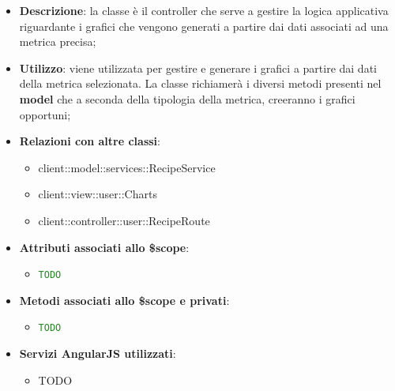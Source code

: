 			\begin{itemize}
				\item \textbf{Descrizione}: la classe è il controller che serve a gestire la logica applicativa riguardante i grafici che vengono generati a partire dai dati associati ad una metrica precisa;
				\item \textbf{Utilizzo}: viene utilizzata per gestire e generare i grafici a partire dai dati della metrica selezionata. La classe richiamerà i diversi metodi presenti nel \textbf{model} che a seconda della tipologia della metrica, creeranno i grafici opportuni;
				\item \textbf{Relazioni con altre classi}:
					\begin{itemize}
						\item client::model::services::RecipeService
						\item client::view::user::Charts
						\item client::controller::user::RecipeRoute
					\end{itemize}

				\item \textbf{Attributi associati allo \$scope}:
					\begin{itemize}
						\item \textcolor{forestgreen}{\texttt{TODO}}

					\end{itemize}

				\item \textbf{Metodi associati allo \$scope e privati}:
					\begin{itemize}
						\item \textcolor{forestgreen}{\texttt{TODO}}

					\end{itemize}

				\item \textbf{Servizi AngularJS utilizzati}:
					\begin{itemize}
						\item TODO
					\end{itemize}

			\end{itemize}

